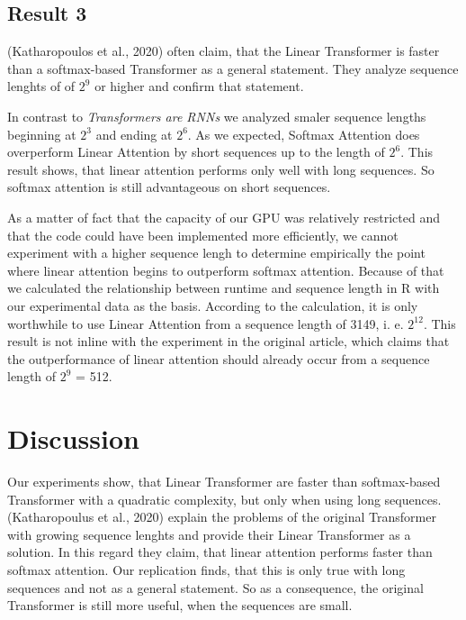 \documentclass[DIV=13,fontsize=11pt]{scrartcl}
\begin{document}
\subsection{Result 3}
(Katharopoulos et al., 2020) often claim, that the Linear Transformer is faster than a softmax-based Transformer as a general statement. They analyze sequence lenghts of of \(2^9\) or higher and confirm that statement. 

In contrast to \textit{Transformers are RNNs} we analyzed smaler sequence lengths beginning at  \(2^3\) and ending at \(2^6\).  As we expected, Softmax Attention does overperform Linear Attention by short sequences up to the length of \(2^6\). This result shows, that linear attention performs only well with long sequences.  So softmax attention is still advantageous on short sequences.

As a matter of fact that the capacity of our GPU was relatively restricted and that the code could have been implemented more efficiently,  we cannot experiment with a higher sequence lengh to determine empirically the point where linear attention begins to outperform softmax attention.  Because of that we calculated the relationship between runtime and sequence length in R with our experimental data as the basis. According to the calculation, it is only worthwhile to use Linear Attention from a sequence length of 3149, i. e.  \(2^{12}\). This result is not inline with the experiment in the original article, which claims that the outperformance of linear attention should already occur from a sequence length of \(2^9\) = 512. 


\section{Discussion}
Our experiments show, that Linear Transformer are faster than softmax-based Transformer with a quadratic complexity, but only when using long sequences. (Katharopoulus et al., 2020) explain the problems of the original Transformer with growing sequence lenghts and provide their Linear Transformer as a solution. In this regard they claim, that linear attention performs faster than softmax attention. Our replication finds, that this is only true with long sequences and not as a general statement. So as a consequence, the original Transformer is still more useful, when the sequences are small. 
\end{document}
